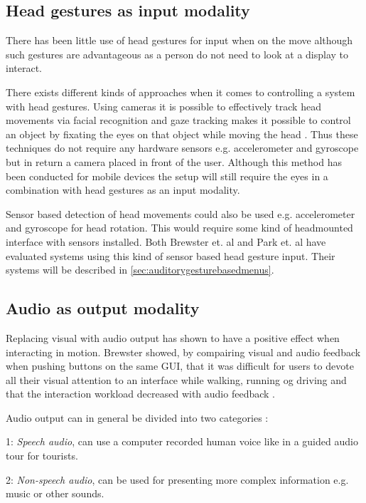 \subsection{Head gestures as input modality}

There has been little use of head gestures for input when on the move \cite{brewster_multimodaleyes-freeinteraction_2003} although such gestures are advantageous as a person do not need to look at a display to interact.

There exists different kinds of approaches when it comes to controlling a system with head gestures. Using cameras it is possible to effectively track head movements via facial recognition \cite{morimoto_recognition_1996} and gaze tracking makes it possible to control an object by fixating the eyes on that object while moving the head \cite{vspakov_enhanced_2012}. Thus these techniques do not require any hardware sensors e.g. accelerometer and gyroscope but in return a camera placed in front of the user. Although this method has been conducted for mobile devices \cite{mardanbegi_eye-based_2012} the setup will still require the eyes in a combination with head gestures as an input modality.

Sensor based detection of head movements could also be used e.g. accelerometer and gyroscope for head rotation. This would require some kind of headmounted interface with sensors installed. Both Brewster et. al \cite{brewster_multimodaleyes-freeinteraction_2003} and Park et. al \cite{park_gaze-directed_2011} have evaluated systems using this kind of sensor based head gesture input. Their systems will be described in \ref{sec:auditorygesturebasedmenus}.

\subsection{Audio as output modality}
\label{sec:audiomodality}
Replacing visual with audio output has shown to have a positive effect when interacting in motion. Brewster showed, by compairing visual and audio feedback when pushing buttons on the same GUI, that it was difficult for users to devote all their visual attention to an interface while walking, running og driving and that the interaction workload decreased with audio feedback \cite{brewster_overcoming_2002}.

Audio output can in general be divided into two categories \cite{rocchesso_sounding_2003}:
\begin{description}
\item{1: \textit{Speech audio}}, can use a computer recorded human voice like in a guided audio tour for tourists.
\item{2: \textit{Non-speech audio}}, can be used for presenting more complex information e.g. music or other sounds.
\end{description}

